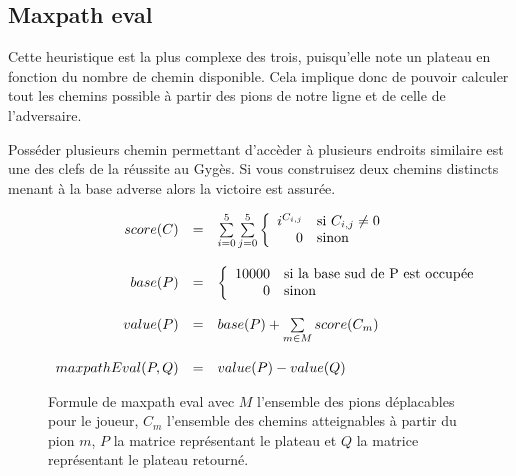 \subsection{Maxpath eval}

	Cette heuristique est la plus complexe des trois, puisqu'elle note un plateau en
	fonction du nombre de chemin disponible. Cela implique donc de pouvoir calculer
	tout les chemins possible à partir des pions de notre ligne et de celle de l'adversaire.

	Posséder plusieurs chemin permettant d'accèder à plusieurs endroits similaire est une des
	clefs de la réussite au Gygès. Si vous construisez deux chemins distincts menant à la base adverse
	alors la victoire est assurée.

	\begin{figure}[h!]
	\[
		\begin{array}{r c l}

			score(C) &= & \sum\limits_{i=0}^{5} \sum\limits_{j=0}^{5}
			\left\{
			\begin{array}{r l}
				i^{C_{i,j}} & $si $ C_{i,j} \neq 0 \\
				0 & $sinon$ \\
			\end{array}
			\right. \\

			&& \\

			base(P) &= &
			\left\{
			\begin{array}{r l}
				10000 & $si la base sud de P est occupée$ \\
				0 & $sinon$ \\
			\end{array}
			\right. \\

			&& \\

			value(P) &= & base(P) + \sum\limits_{m \in M} score(C_m) \\

			&& \\

			maxpathEval(P,Q) &=& value(P) - value(Q)\\

		\end{array}
	\]
	\caption[Formule de maxpath eval]{Formule de maxpath eval avec $M$ l'ensemble des pions déplacables pour le joueur,
	$C_m$ l'ensemble des chemins atteignables à partir du pion $m$,
	$P$ la matrice représentant le plateau et
	$Q$ la matrice représentant le plateau retourné.}
	\label{fig:formula_maxpath_eval}
	\end{figure}
